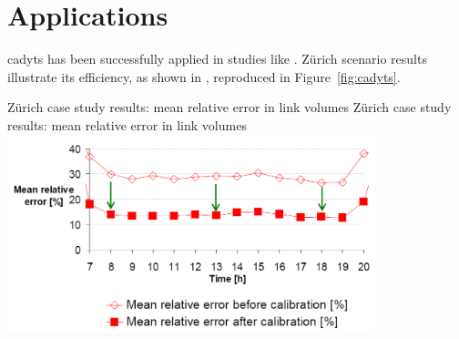 \section{Applications}
\gls{cadyts} has been successfully applied in studies like %
\citet[][]{ZiemkeNagelBhat2014IntegratingCemdapMatsimTransferabilityVSPWP,ZilskeNagelPhoneTracesAndCadyts, FloetteroedChenEtAl2011BehavioralCalibAndAnaNETS}. 
Zürich scenario results illustrate its efficiency, as shown in \citet[][Slide~8]{FloetteroedEtAl_unpub_MATSimUserMeeting_2011}, 
reproduced in Figure~\ref{fig:cadyts}.

\createfigure%
{Zürich case study results: mean relative error in link volumes}%
{Zürich case study results: mean relative error in link volumes}%
{\label{fig:cadyts}}%
{\includegraphics[width=0.8\textwidth, angle=0]{extending/figures/cadyts/cadyts}}%
{\citet[][Slide~8]{FloetteroedEtAl_unpub_MATSimUserMeeting_2011}}

